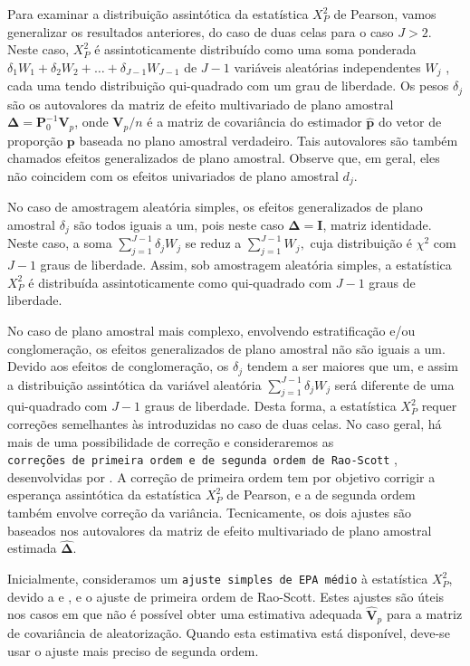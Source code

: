 \documentclass[]{book}
\theoremstyle{definition}
\theoremstyle{definition}
\theoremstyle{definition}
\theoremstyle{remark}
\begin{document}
Para examinar a distribuição assintótica da estatística \(X_{P}^{2}\) de
Pearson, vamos generalizar os resultados anteriores, do caso de duas
celas para o caso \(J>2\). Neste caso, \(X_{P}^{2}\) é assintoticamente
distribuído como uma soma ponderada
\(\delta_{1}W_{1}+\delta _{2}W_{2}+\ldots +\delta _{J-1}W_{J-1}\) de
\(J-1\) variáveis aleatórias independentes \(W_{j}\) , cada uma tendo
distribuição qui-quadrado com um grau de liberdade. Os pesos
\(\delta _{j}\) são os autovalores da matriz de efeito multivariado de
plano amostral \(\mathbf{\Delta }=\mathbf{P}_{0}^{-1}\mathbf{V}_{p}\),
onde \(\mathbf{V}_{p}\mathbf{/}n\) é a matriz de covariância do
estimador \(\widehat{\mathbf{p}}\) do vetor de proporção \(\mathbf{p}\)
baseada no plano amostral verdadeiro. Tais autovalores são também
chamados efeitos generalizados de plano amostral. Observe que, em geral,
eles não coincidem com os efeitos univariados de plano amostral
\(d_{j}\).

No caso de amostragem aleatória simples, os efeitos generalizados de
plano amostral \(\delta_{j}\) são todos iguais a um, pois neste caso
\(\mathbf{\Delta =I}\), matriz identidade. Neste caso, a soma
\(\sum_{j=1}^{J-1}\delta _{j}W_{j}\) se reduz a
\(\sum_{j=1}^{J-1}W_{j},\) cuja distribuição é \(\chi ^{2}\) com \(J-1\)
graus de liberdade. Assim, sob amostragem aleatória simples, a
estatística \(X_{P}^{2}\) é distribuída assintoticamente como
qui-quadrado com \(J-1\) graus de liberdade.

No caso de plano amostral mais complexo, envolvendo estratificação e/ou
conglomeração, os efeitos generalizados de plano amostral não são iguais
a um. Devido aos efeitos de conglomeração, os \(\delta _{j}\) tendem a
ser maiores que um, e assim a distribuição assintótica da variável
aleatória \(\sum_{j=1}^{J-1}\delta_{j}W_{j}\) será diferente de uma
qui-quadrado com \(J-1\) graus de liberdade. Desta forma, a estatística
\(X_{P}^{2}\) requer correções semelhantes às introduzidas no caso de
duas celas. No caso geral, há mais de uma possibilidade de correção e
consideraremos as
\texttt{correções\ de\ primeira\ ordem\ e\ de\ segunda\ ordem\ de\ Rao-Scott}
, desenvolvidas por \citep{Rao}. A correção de primeira ordem tem por
objetivo corrigir a esperança assintótica da estatística \(X_{P}^{2}\)
de Pearson, e a de segunda ordem também envolve correção da variância.
Tecnicamente, os dois ajustes são baseados nos autovalores da matriz de
efeito multivariado de plano amostral estimada
\(\widehat{\mathbf{\Delta }}\).

Inicialmente, consideramos um \texttt{ajuste\ simples\ de\ EPA\ médio} à
estatística \(X_{P}^{2}\), devido a \citep{fellegi} e \citep{holt80a}, e
o ajuste de primeira ordem de Rao-Scott. Estes ajustes são úteis nos
casos em que não é possível obter uma estimativa adequada
\(\mathbf{\hat{V}}_{p}\) para a matriz de covariância de aleatorização.
Quando esta estimativa está disponível, deve-se usar o ajuste mais
preciso de segunda ordem.
\end{document}

